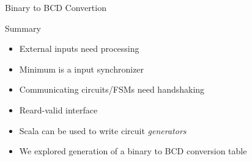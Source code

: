 \begin{frame}[fragile]{Binary to BCD Convertion}
\end{frame}



\begin{frame}[fragile]{Summary}
\begin{itemize}
\item External inputs need processing
\item Minimum is a input synchronizer
\item Communicating circuits/FSMs need handshaking
\item Reard-valid interface
\item Scala can be used to write circuit \emph{generators}
\item We explored generation of a binary to BCD conversion table
\end{itemize}
\end{frame}





